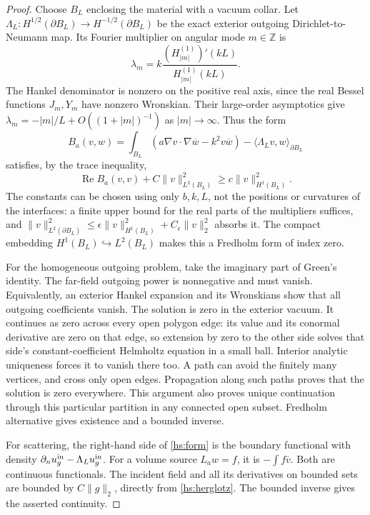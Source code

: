 \begin{proof}
Choose $B_L$ enclosing the material with a vacuum collar.  Let
$\Lambda_L:H^{1/2}(\partial B_L)\to H^{-1/2}(\partial B_L)$ be the
exact exterior outgoing Dirichlet-to-Neumann map.  Its Fourier
multiplier on angular mode $m\in\mathbb Z$ is
\begin{equation}
 \lambda_m=k\frac{(H_{|m|}^{(1)})'(kL)}{H_{|m|}^{(1)}(kL)}.
 \label{hs:dtn}
\end{equation}
The Hankel denominator is nonzero on the positive real axis, since
the real Bessel functions $J_m,Y_m$ have nonzero Wronskian.
Their large-order asymptotics give
$\lambda_m=-|m|/L+O((1+|m|)^{-1})$ as $|m|\to\infty$.
Thus the form
\begin{equation}
 B_a(v,w)=\int_{B_L}\left(a\nabla v\cdot\nabla\overline w
                           -k^2v\overline w\right)
        -\langle\Lambda_Lv,w\rangle_{\partial B_L}
 \label{hs:form}
\end{equation}
satisfies, by the trace inequality,
\begin{equation}
 \operatorname{Re}B_a(v,v)+C\|v\|_{L^2(B_L)}^2
       \geq c\|v\|_{H^1(B_L)}^2.
 \label{hs:garding}
\end{equation}
The constants can be chosen using only $b,k,L$, not the positions or
curvatures of the interfaces: a finite upper bound for the real parts
of the multipliers suffices, and
$\|v\|_{L^2(\partial B_L)}^2\leq
\epsilon\|v\|_{H^1(B_L)}^2+C_\epsilon\|v\|_2^2$ absorbs it.
The compact embedding $H^1(B_L)\hookrightarrow L^2(B_L)$ makes this
a Fredholm form of index zero.

For the homogeneous outgoing problem, take the imaginary part of
Green's identity.  The far-field outgoing power is nonnegative and
must vanish.  Equivalently, an exterior Hankel expansion and its
Wronskians show that all outgoing coefficients vanish.  The solution
is zero in the exterior vacuum.  It continues as zero across every
open polygon edge: its value and its conormal derivative are zero
on that edge, so extension by zero to the other side solves that
side's constant-coefficient Helmholtz equation in a small ball.
Interior analytic uniqueness forces it to vanish there too.
A path can avoid the finitely many vertices, and cross only open
edges.  Propagation along such paths proves that the solution is zero
everywhere.  This argument also proves unique continuation through
this particular partition in any connected open subset.
Fredholm alternative gives existence and a bounded inverse.

For scattering, the right-hand side of \eqref{hs:form} is the boundary
functional with density
$\partial_nu_g^{\rm in}-\Lambda_Lu_g^{\rm in}$.
For a volume source $L_aw=f$, it is $-\int f\overline v$.
Both are continuous functionals.  The incident field and all its
derivatives on bounded sets are bounded by $C\|g\|_2$, directly from
\eqref{hs:herglotz}.  The bounded inverse gives the asserted continuity.
\end{proof}

